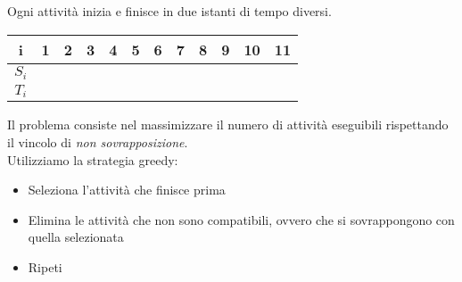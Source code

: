 \begin{example}
	Ogni attività inizia e finisce in due istanti di tempo diversi. \\
	\begin{table}[!h]
		\centering
		\begin{tabular}{|c|c|c|c|c|c|c|c|c|c|c|c|}
			\hline
			\textbf{i} & 1 & 2 & 3 & 4 & 5 & 6 & 7 & 8 & 9 & 10 & 11 \\
			\hline
			\textbf{$S_i$} \\
			\hline
			\textbf{$T_i$} \\
			\hline
		\end{tabular}
	\end{table}
	Il problema consiste nel massimizzare il numero di attività eseguibili rispettando il vincolo di \emph{non sovrapposizione}.\\
	Utilizziamo la strategia greedy:
	\begin{itemize}
		\item Seleziona l'attività che finisce prima
		\item Elimina le attività che non sono compatibili, ovvero che si sovrappongono con quella selezionata
		\item Ripeti
	\end{itemize}
\end{example}